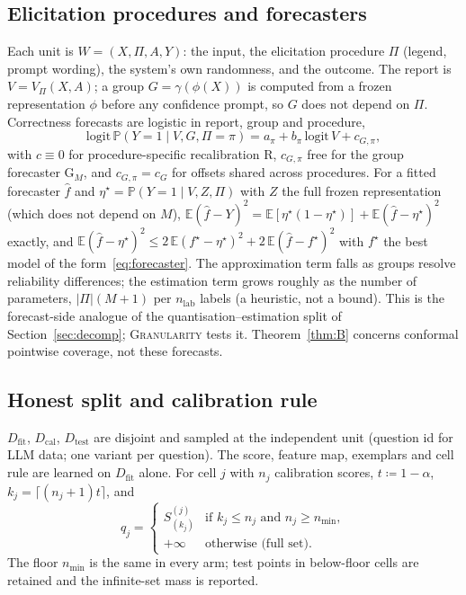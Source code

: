 \documentclass[twoside]{article}
\theoremstyle{definition}
\theoremstyle{remark}
\newcommand{\Dfit}{D_{\mathrm{fit}}}
\newcommand{\Dcal}{D_{\mathrm{cal}}}
\newcommand{\Dtest}{D_{\mathrm{test}}}
\newcommand{\E}{\mathbb{E}}
\renewcommand{\P}{\mathbb{P}}
\newcommand{\1}{\mathbf{1}}
\newcommand{\expname}[1]{\textsc{#1}}
\begin{document}
\subsection{Elicitation procedures and forecasters}
\label{sec:forecasters}
Each unit is $W=(X,\Pi,A,Y)$: the input, the elicitation procedure $\Pi$ (legend, prompt wording), the
system's own randomness, and the outcome. The report is $V=V_\Pi(X,A)$; a group $G=\gamma(\phi(X))$ is
computed from a frozen representation $\phi$ before any confidence prompt, so $G$ does not depend on
$\Pi$. Correctness forecasts are logistic in report, group and procedure,
\begin{equation}
  \mathrm{logit}\,\P(Y=1\mid V,G,\Pi=\pi) = a_\pi + b_\pi\,\mathrm{logit}\,V + c_{G,\pi},
  \label{eq:forecaster}
\end{equation}
with $c\equiv0$ for procedure-specific recalibration R, $c_{G,\pi}$ free for the group forecaster
G$_M$, and $c_{G,\pi}=c_G$ for offsets shared across procedures. For a fitted forecaster $\hat f$ and
$\eta^\star=\P(Y=1\mid V,Z,\Pi)$ with $Z$ the full frozen representation (which does not depend on $M$),
$\E(\hat f-Y)^2=\E[\eta^\star(1-\eta^\star)]+\E(\hat f-\eta^\star)^2$ exactly, and
$\E(\hat f-\eta^\star)^2\le2\,\E(f^\star-\eta^\star)^2+2\,\E(\hat f-f^\star)^2$ with $f^\star$ the best model of
the form~\eqref{eq:forecaster}. The approximation term falls as groups resolve reliability
differences; the estimation term grows roughly as the number of parameters, $|\Pi|(M+1)$ per
$n_{\mathrm{lab}}$ labels (a heuristic, not a bound). This
is the forecast-side analogue of the quantisation--estimation split of
Section~\ref{sec:decomp}; \expname{Granularity} tests it. Theorem~\ref{thm:B} concerns conformal pointwise coverage,
not these forecasts.

\subsection{Honest split and calibration rule}
$\Dfit$, $\Dcal$, $\Dtest$ are disjoint and sampled at the independent unit
(question id for LLM data; one variant per question). The score, feature map,
exemplars and cell rule are learned on $\Dfit$ alone. For cell $j$ with $n_j$
calibration scores, $t \coloneqq 1-\alpha$,
$k_j = \lceil (n_j+1)t \rceil$, and
\[
  q_j =
  \begin{cases}
    S_{(k_j)}^{(j)} & \text{if } k_j \le n_j \text{ and } n_j \ge n_{\min},\\
    +\infty & \text{otherwise (full set)}.
  \end{cases}
\]
The floor $n_{\min}$ is the same in every arm; test points in below-floor cells
are retained and the infinite-set mass is reported.
\end{document}
